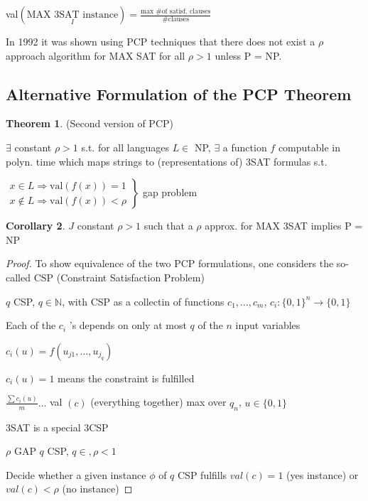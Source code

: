 \documentclass[11pt]{article}
\theoremstyle{definition}
\newtheorem{theorem}{Theorem}[section]
\newtheorem{corollary}[theorem]{Corollary}
\theoremstyle{definition}
\begin{document}
val$( \underset{I}{\text{MAX 3SAT instance}}) = \frac{\text{max \# of satisf. clauses}}{\#\text{clauses}} $

In 1992 it was shown using PCP techniques that there does not exist a $ \rho $ approach algorithm for MAX SAT for all $ \rho > 1 $ unless P = NP. \newline

\subsection{Alternative Formulation of the PCP Theorem}

\begin{theorem}
(Second version of PCP)

$ \exists $ constant $ \rho > 1$ s.t. for all languages $ L \in $ NP, $ \exists $ a function $ f $ computable in polyn. time which maps strings to (representations of) 3SAT formulas s.t.

$ \left. \begin{array}{l} x \in L \Rightarrow \text{val}(f(x)) = 1 \\
x \not \in L \Rightarrow \text{val}(f(x)) < \rho \end{array}
\right\} $
gap problem
\end{theorem}

\begin{corollary}
$ J $ constant $ \rho > 1 $ such that a $ \rho $ approx. for MAX 3SAT implies P = NP
\end{corollary}

\begin{proof}

To show equivalence of the two PCP formulations, one considers the so-called CSP (Constraint Satisfaction Problem)

$ q $ CSP, $ q \in \mathbb{N} $, with CSP as a collectin of functions $ c_1, \dots, c_m $,
$ c_i : \{ 0, 1\}^n \rightarrow \{0, 1\} $ 

Each of the $ c_i$ 's depends on only at most $ q $ of the $ n $ input variables

$ c_i(u) = f(u_{j1}, \dots, u_{j_q}) $

$ c_i(u)  = 1 $ means the constraint is fulfilled

$ \frac{ \sum c_i(u)}{m} \dots $ val $( c) $ (everything together) max over $ q_n $, $ u \in \{0, 1\} $


3SAT is a special 3CSP

$ \rho $ GAP  $ q $ CSP, $ q \in \mathbb, \rho < 1 $

Decide whether a given instance $ \phi $ of $ q $ CSP fulfills $ val (c) = 1$  (yes instance) or $ val(c) < \rho $ (no instance)

\end{proof}
\end{document}
